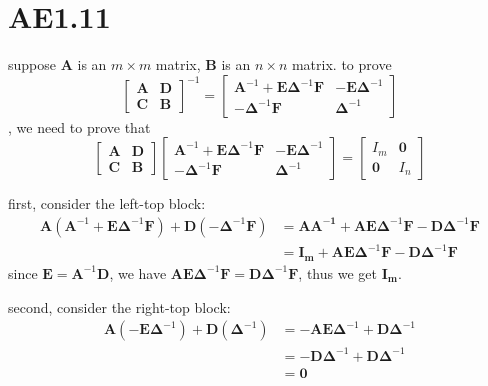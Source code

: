 \documentclass[12pt,a4paper]{article}
\begin{document}
\section{AE1.11}

suppose $\mathbf{A}$ is an $m \times m$ matrix, $\mathbf{B}$ is an $n \times n$ matrix.
to prove
\[
\begin{bmatrix}
    \mathbf{A} & \mathbf{D} \\
    \mathbf{\mathbf{C}} & \mathbf{B}
\end{bmatrix}^{-1} = \begin{bmatrix}
    \mathbf{A}^{-1}+\mathbf{E}\mathbf{\Delta}^{-1}\mathbf{F} & -\mathbf{E}\mathbf{\Delta}^{-1} \\
    -\mathbf{\Delta}^{-1}\mathbf{F} & \mathbf{\Delta}^{-1}
\end{bmatrix}
\], 
we need to prove that
\[
    \begin{bmatrix}
        \mathbf{A} & \mathbf{D} \\
        \mathbf{\mathbf{C}} & \mathbf{B}
    \end{bmatrix} \begin{bmatrix}
        \mathbf{A}^{-1}+\mathbf{E}\mathbf{\Delta}^{-1}\mathbf{F} & -\mathbf{E}\mathbf{\Delta}^{-1} \\
        -\mathbf{\Delta}^{-1}\mathbf{F} & \mathbf{\Delta}^{-1}
    \end{bmatrix} = \begin{bmatrix}
        I_m & \mathbf{0} \\
        \mathbf{0} & I_n
    \end{bmatrix}
\]

first, consider the left-top block:
\[
    \begin{aligned}
        \mathbf{A}(\mathbf{A}^{-1}+\mathbf{E}\mathbf{\Delta}^{-1}\mathbf{F}) + \mathbf{D}(-\mathbf{\Delta}^{-1}\mathbf{F}) & = \mathbf{AA^{-1}} + \mathbf{AE}\mathbf{\Delta}^{-1}\mathbf{F} - \mathbf{D}\mathbf{\Delta}^{-1}\mathbf{F} \\
                                                     & = \mathbf{I_m} + \mathbf{AE}\mathbf{\Delta}^{-1}\mathbf{F} - \mathbf{D}\mathbf{\Delta}^{-1}\mathbf{F}
    \end{aligned}
\]
since $\mathbf{E} = \mathbf{A}^{-1}\mathbf{D}$, we have $\mathbf{AE}\mathbf{\Delta}^{-1}\mathbf{F} = \mathbf{D}\mathbf{\Delta}^{-1}\mathbf{F}$, thus we get $\mathbf{I_m}$.

second, consider the right-top block:
\[
    \begin{aligned}
        \mathbf{A}(-\mathbf{E}\mathbf{\Delta}^{-1}) + \mathbf{D}(\mathbf{\Delta}^{-1}) & = -\mathbf{AE}\mathbf{\Delta}^{-1} + \mathbf{D}\mathbf{\Delta}^{-1} \\
                                          & = -\mathbf{D}\mathbf{\Delta}^{-1} + \mathbf{D}\mathbf{\Delta}^{-1} \\
                                          & = \mathbf{0}
    \end{aligned}
\]
\end{document}
